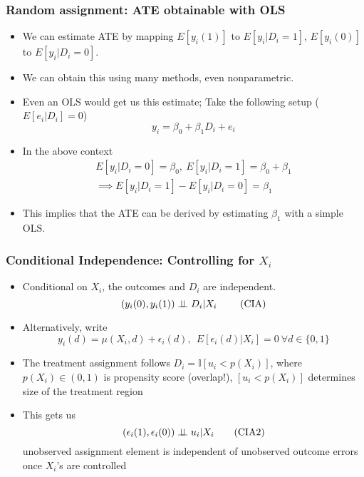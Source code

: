 \documentclass[aspectratio=169]{beamer}
\begin{document}
\begin{frame}
\frametitle{Random assignment: ATE obtainable with OLS}
\begin{itemize}
\item We can estimate ATE by mapping $E[y_i(1)]$ to $E[y_i|D_i=1]$, $E[y_i(0)]$ to $E[y_i|D_i=0]$. 
\item We can obtain this using many methods, even nonparametric. 
\item Even an OLS would get us this estimate; Take the following setup ($E[e_i|D_i]=0$)
\[
y_ i = \beta_0 + \beta_1 D_i+e_i
\]
\item In the above context
\begin{gather*}
E[y_i|D_i=0]=\beta_0,\  E[y_i|D_i=1]=\beta_0+\beta_1 \\
\implies E[y_i|D_i=1] - E[y_i|D_i=0] = \beta_1
\end{gather*}
\item This implies that the ATE can be derived by estimating $\beta_1$ with a simple OLS.
\end{itemize}
\end{frame}

\begin{frame}
\frametitle{Conditional Independence: Controlling for $X_i$}
\begin{itemize}
\item Conditional on $X_i$, the outcomes and $D_i$ are independent. 
\[
 (y_i(0), y_i(1)) \perp \!\!\! \perp D_i|X_i \ \tag{\text{CIA}}\label{CIA}
\]
\item Alternatively, write 
\[
y_i(d)=\mu(X_i,d)+\epsilon_i(d),  \ \ E[\epsilon_i(d)|X_i]=0  \ \forall d \in \{0,1\}
\]
\item The treatment assignment follows $D_i = \mathbb{I}[u_i<p(X_i)]$, 
where $p(X_i)\in(0,1)$ is propensity score (overlap!), $[u_i<p(X_i)]$ determines size of the treatment region
\item This gets us 
\[
(\epsilon_i(1), \epsilon_i(0))\perp \!\!\! \perp u_i|X_i \tag{\text{CIA2}}\label{CIA2}
\]
unobserved assignment element is independent of unobserved outcome errors once $X_i$'s are controlled
\end{itemize}
\end{frame}
\end{document}
